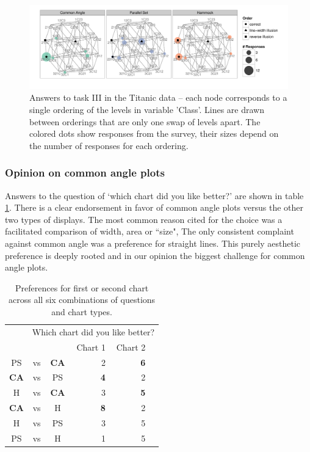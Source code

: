 \documentclass[journal]{vgtc}\usepackage{graphicx, color}
\begin{document}
\begin{figure}
\includegraphics[width=\linewidth]{cubes}
\caption{Answers to task III in the Titanic data -- each node corresponds to a single ordering of the levels in variable 'Class'. Lines are drawn between orderings that are only one swap of levels apart. The colored dots show responses from the survey, their sizes depend on the number of responses for each ordering. }
\label{cubes}
\end{figure}



\subsubsection*{Opinion on common angle plots}
Answers to the question of `which chart did you like better?' are shown in table \ref{tab:prefer}. There is a  clear endorsement in favor of common angle plots versus the other two types of displays.
The most common reason cited for the choice was a facilitated comparison of width, area or ``size", 
The only consistent complaint against common angle was a preference for straight lines.
 This purely aesthetic preference is deeply rooted and in our opinion the biggest challenge for common angle plots.
\begin{table}[ht]
\begin{center}
\begin{tabular}{cccrrr}
  \hline
&\multicolumn{5}{r}{Which chart did you like better?}\\
&&& Chart 1 &  Chart 2 \\ 
  \hline
  PS &vs&  {\bf CA} & 2 & \bf 6 \\ 
 {\bf  CA} & vs &  PS & \bf 4 & 2 \\ 
  H & vs &   {\bf  CA} & 3 & \bf 5 \\ 
   {\bf  CA} & vs &  H & \bf 8 & 2 \\ 
  H & vs &  PS & 3 & 5 \\ 
  PS & vs &  H & 1 & 5 \\ 
   \hline
\end{tabular}
\caption{\label{tab:prefer} Preferences for first or second chart across all six combinations of questions and chart types. }
\vspace{-0.3in}
\end{center}
\end{table}
\end{document}
